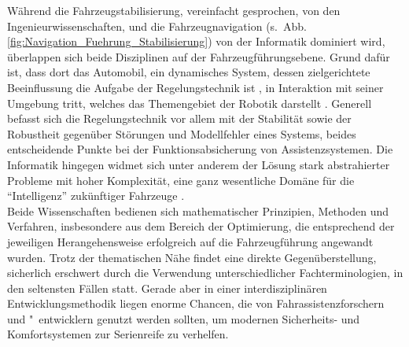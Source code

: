 Während die Fahrzeugstabilisierung, vereinfacht gesprochen, von den Ingenieurwissenschaften, und die 
Fahrzeugnavigation (s.\ Abb.\,\ref{fig:Navigation_Fuehrung_Stabilisierung}) 
von der Informatik dominiert wird, überlappen sich beide Disziplinen auf der 
Fahrzeugführungsebene. Grund dafür ist, dass dort das Automobil, ein dynamisches 
System, dessen zielgerichtete Beeinflussung die Aufgabe der Regelungstechnik ist \cite{lunze2005regelungstechnik, unbehauen1989regelungstechnik, foellingeroptimal}, in Interaktion mit seiner Umgebung tritt, welches das Themengebiet der Robotik darstellt \cite{Thrun2005,Siciliano2008}. 
Generell befasst sich die Regelungstechnik vor allem mit der Stabilität sowie der Robustheit gegenüber Störungen und Modellfehler eines Systems, beides entscheidende Punkte bei der Funktionsabsicherung von Assistenzsystemen. Die Informatik hingegen widmet sich unter anderem der Lösung stark abstrahierter Probleme mit hoher Komplexität, eine ganz wesentliche Domäne für die "`Intelligenz"' zukünftiger Fahrzeuge \cite{eskandarian2012handbook}. \\
Beide Wissenschaften bedienen sich mathematischer Prinzipien, Methoden und Verfahren, insbesondere aus dem Bereich der Optimierung, die entsprechend der jeweiligen Herangehensweise erfolgreich auf die Fahrzeugführung angewandt wurden. Trotz der thematischen Nähe findet eine direkte Gegenüberstellung, sicherlich erschwert durch die Verwendung unterschiedlicher Fachterminologien, in den seltensten Fällen statt. Gerade aber in einer interdisziplinären Entwicklungsmethodik liegen enorme Chancen, die von Fahrassistenzforschern und "~entwicklern genutzt werden sollten, um modernen Sicherheits- und Komfortsystemen zur Serienreife zu verhelfen.

%

